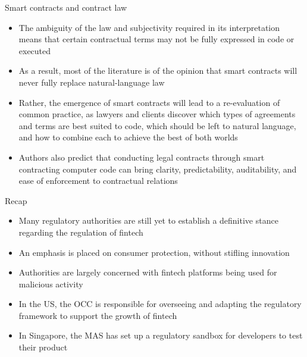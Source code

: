 \documentclass[9pt]{beamer}
\begin{document}

\begin{frame}{Smart contracts and contract law}
	\begin{itemize}
		\item The ambiguity of the law and subjectivity required in its interpretation means that certain contractual terms may not be fully expressed in code or executed
		\item As a result, most of the literature is of the opinion that smart contracts will never fully replace natural-language law
		\item Rather, the emergence of smart contracts will lead to a re-evaluation of common practice, as lawyers and clients discover which types of agreements and terms are best suited to code, which should be left to natural language, and how to combine each to achieve the best of both worlds
		\item Authors also predict that conducting legal contracts through smart contracting computer code can bring clarity, predictability, auditability, and ease of enforcement to contractual relations
	\end{itemize}
\end{frame}



\begin{frame}{Recap}
	\begin{itemize}
		\item Many regulatory authorities are still yet to establish a definitive stance regarding the regulation of fintech
		\item An emphasis is placed on consumer protection, without stifling innovation
		\item Authorities are largely concerned with fintech platforms being used for malicious activity
		\item In the US, the OCC is responsible for overseeing and adapting the regulatory framework to support the growth of fintech
		\item In Singapore, the MAS has set up a regulatory sandbox for developers to test their product
	\end{itemize}
\end{frame}

\end{document}

